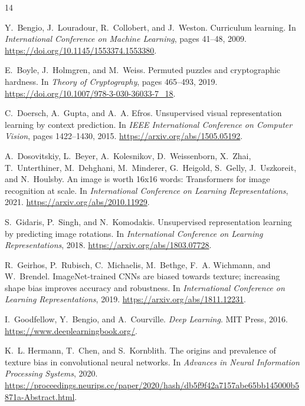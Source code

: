 \documentclass[12pt]{article}
\begin{document}
\clearpage
\begin{thebibliography}{14}

Y.~Bengio, J.~Louradour, R.~Collobert, and J.~Weston.
\newblock Curriculum learning.
\newblock In \emph{International Conference on Machine Learning}, pages 41--48, 2009.
\newblock \url{https://doi.org/10.1145/1553374.1553380}.

E.~Boyle, J.~Holmgren, and M.~Weiss.
\newblock Permuted puzzles and cryptographic hardness.
\newblock In \emph{Theory of Cryptography}, pages 465--493, 2019.
\newblock \url{https://doi.org/10.1007/978-3-030-36033-7_18}.

C.~Doersch, A.~Gupta, and A.~A. Efros.
\newblock Unsupervised visual representation learning by context prediction.
\newblock In \emph{IEEE International Conference on Computer Vision}, pages 1422--1430, 2015.
\newblock \url{https://arxiv.org/abs/1505.05192}.

A.~Dosovitskiy, L.~Beyer, A.~Kolesnikov, D.~Weissenborn, X.~Zhai, T.~Unterthiner, M.~Dehghani, M.~Minderer, G.~Heigold, S.~Gelly, J.~Uszkoreit, and N.~Houlsby.
\newblock An image is worth 16x16 words: Transformers for image recognition at scale.
\newblock In \emph{International Conference on Learning Representations}, 2021.
\newblock \url{https://arxiv.org/abs/2010.11929}.

S.~Gidaris, P.~Singh, and N.~Komodakis.
\newblock Unsupervised representation learning by predicting image rotations.
\newblock In \emph{International Conference on Learning Representations}, 2018.
\newblock \url{https://arxiv.org/abs/1803.07728}.

R.~Geirhos, P.~Rubisch, C.~Michaelis, M.~Bethge, F.~A. Wichmann, and W.~Brendel.
\newblock ImageNet-trained CNNs are biased towards texture; increasing shape bias improves accuracy and robustness.
\newblock In \emph{International Conference on Learning Representations}, 2019.
\newblock \url{https://arxiv.org/abs/1811.12231}.

I.~Goodfellow, Y.~Bengio, and A.~Courville.
\newblock \emph{Deep Learning}.
\newblock MIT Press, 2016.
\newblock \url{https://www.deeplearningbook.org/}.

K.~L. Hermann, T.~Chen, and S.~Kornblith.
\newblock The origins and prevalence of texture bias in convolutional neural networks.
\newblock In \emph{Advances in Neural Information Processing Systems}, 2020.
\newblock \url{https://proceedings.neurips.cc/paper/2020/hash/db5f9f42a7157abe65bb145000b5871a-Abstract.html}.


\end{thebibliography}
\end{document}
